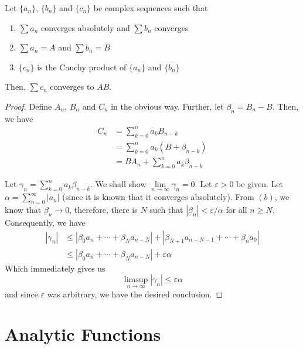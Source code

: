 \begin{theorem}[Mertens]
    Let $\{a_n\}$, $\{b_n\}$ and $\{c_n\}$ be complex sequences such that 
    \begin{enumerate}[label=(\alph*)]
        \item $\sum a_n$ converges absolutely and $\sum b_n$ converges
        \item $\sum a_n = A$ and $\sum b_n = B$
        \item $\{c_n\}$ is the Cauchy product of $\{a_n\}$ and $\{b_n\}$
    \end{enumerate}
    Then, $\sum c_n$ converges to $AB$.
\end{theorem}
\begin{proof}
    Define $A_n$, $B_n$ and $C_n$ in the obvious way. Further, let $\beta_n = B_n - B$. Then, we have 
    \begin{align*}
        C_n &= \sum_{k = 0}^na_kB_{n - k}\\
        &= \sum_{k = 0}^n a_k(B + \beta_{n - k})\\
        &= BA_n + \sum_{k = 0}^n a_k\beta_{n - k}
    \end{align*}

    Let $\gamma_n = \sum\limits_{k = 0}^na_k\beta_{n - k}$. We shall show $\lim\limits_{n\to\infty}\gamma_n = 0$. Let $\varepsilon > 0$ be given. Let $\alpha = \sum\limits_{n = 0}^\infty |a_n|$ (since it is known that it converges absolutely). From $(b)$, we know that $\beta_n\to 0$, therefore, there is $N$ such that $|\beta_n| < \varepsilon/\alpha$ for all $n\ge N$. Consequently, we have 
    \begin{align*}
        |\gamma_n| &\le|\beta_0a_n + \cdots + \beta_Na_{n - N}| + |\beta_{N + 1}a_{n - N - 1} + \cdots + \beta_na_0|\\
        &\le |\beta_0a_n + \cdots + \beta_Na_{n - N}| + \varepsilon\alpha
    \end{align*}
    Which immediately gives us 
    \begin{equation*}
        \limsup_{n\to\infty}|\gamma_n|\le\varepsilon\alpha
    \end{equation*}
    and since $\varepsilon$ was arbitrary, we have the desired conclusion.
\end{proof}

\section{Analytic Functions}


